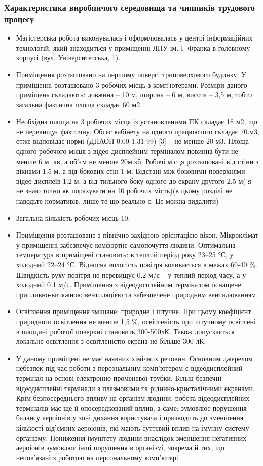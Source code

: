 \documentclass[12pt,a4paper]{article}
\begin{document}
\subsubsection{Характеристика виробничого середовища та чинників трудового процесу}
\begin{itemize}
  \item Магістерська робота виконувалась і оформлювалась у центрі інформаційних технологій, який знаходиться у приміщенні ЛНУ ім. І. Франка в головному корпусі (вул. Університетська, 1).
  \item Приміщення розташовано на першому поверсі триповерхового будинку. У приміщенні розташовано 3 робочих місць з комп’ютерами. Розміри даного приміщень складають: довжина – 10 м, ширина – 6 м, висота – 3,5 м, тобто загальна фактична площа складає 60 м2.
  \item Необхідна площа на 3 робочих місця із установленими ПК складає 18 м2, що не перевищує фактичну. Обсяг кабінету на одного працюючого складає 70.м3, отже відповідає нормі (ДНАОП 0.00-1.31-99) [3] – не менше 20 м3. Площа одного робочого місця з відео дисплейним терміналом повинна бути не менше 6 м. кв, а об’єм не менше 20м.кб. Робочі місця розташовані від стіни з вікнами 1.5 м. а від бокових стін 1 м. Відстані між боковими поверхнями відео дисплеїв 1.2 м, а від тильного боку одного до екрану другого 2.5 м( я не знаю точно як порахувати на 10 робочих мість)(в цьому розділі  не наводьте нормативів, лише  те що реально  є. Це можна видалити)
  \item Загальна кількість робочих місць 10.
  \item Приміщення розташоване з північно-західною орієнтацією вікон. Мікроклімат у приміщенні забезпечує комфортне самопочуття людини. Оптимальна температура в приміщені становить: в теплий період року 23–25 °С, у холодний 22–24 °С. Відносна вологість повітря коливається в межах 60-40 \%. Швидкість руху повітря не перевищує 0.2 м/с – у теплий період часу, а у холодний 0.1 м/с. Приміщення з відеодисплейним терміналом оснащене припливно-витяжною вентиляцією та забезпечене природним вентилюванням.
  \item Освітлення приміщення змішане: природне і штучне. При цьому коефіцієнт природного освітлення не менше 1,5 \%, освітленість при штучному освітлені в площині робочої поверхні становить 300-500лК. Також допускається локальне освітлення з освітленістю екрана не більше 300 лК.
  \item У даному приміщені не має наявних хімічних речовин. Основним джерелом небезпек під час роботи з персональним комп’ютером є відеодисплейний термінал на основі електронно-променевої трубки. Більш безпечні відеодисплейні термінали з плазмовими та рідинно-кристалічними екранами. Крім безпосереднього впливу на організм людини, робота відеодисплейних терміналів має ще й опосередкований вплив, а саме: зумовлює порушення балансу аероіонів у зоні дихання користувача і призводить до зменшення кількості від’ємних аероіонів, які мають суттєвий вплив на імунну систему організму. Пониження імунітету людини внаслідок зменшення негативних аероіонів зумовлює інші порушення в організмі, зокрема й тих, що непов’язані з роботою на персональному комп’ютері.

\end{itemize}
\end{document}
